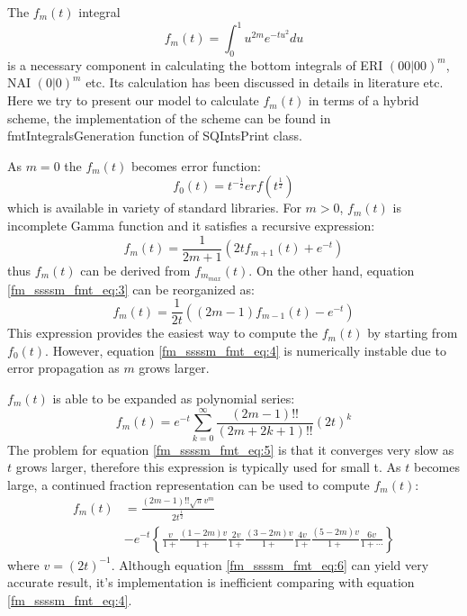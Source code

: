 The $f_{m}(t)$ integral
\begin{equation}\label{fm_ssssm_fmt_eq:1}
 f_{m}(t) = \int^{1}_{0} u^{2m} e^{-tu^{2}} du 
\end{equation}
is a necessary component in calculating the bottom integrals of ERI $(00|00)^{m}$,
NAI $(0|0)^{m}$ etc. Its calculation has been discussed in details in literature
\cite{harris1983sssm, gill1991two} etc. Here we try to present our model to calculate
$f_{m}(t)$ in terms of a hybrid scheme, the implementation of the scheme can be 
found in fmtIntegralsGeneration function of SQIntsPrint class.

As $m=0$ the $f_{m}(t)$ becomes error function:
\begin{equation}
 f_{0}(t) = t^{-\frac{1}{2}} erf(t^{\frac{1}{2}})
\label{fm_ssssm_fmt_eq:2}
\end{equation}
which is available in variety of standard libraries. For $m>0$, $f_{m}(t)$
is incomplete Gamma function and it satisfies a recursive expression:
\begin{equation}
  f_{m}(t) = \frac{1}{2m+1}\left( 2tf_{m+1}(t) + e^{-t}\right)  
 \label{fm_ssssm_fmt_eq:3}
\end{equation}
thus $f_{m}(t)$ can be derived from $f_{m_{max}}(t)$. On the other hand, equation
\ref{fm_ssssm_fmt_eq:3} can be reorganized as:
\begin{equation}
  f_{m}(t) = \frac{1}{2t}\left( (2m-1)f_{m-1}(t) - e^{-t}\right)    
 \label{fm_ssssm_fmt_eq:4}
\end{equation}
This expression provides the easiest way to compute the $f_{m}(t)$ by starting from 
$f_{0}(t)$. However, equation \ref{fm_ssssm_fmt_eq:4} is numerically instable due to
error propagation as $m$ grows larger.

$f_{m}(t)$ is able to be expanded as polynomial series:
\begin{equation}
 \label{fm_ssssm_fmt_eq:5}
 f_{m}(t) = e^{-t}\sum_{k=0}^{\infty}\frac{(2m-1)!!}{(2m+2k+1)!!}
 (2t)^{k}
\end{equation}
The problem for equation \ref{fm_ssssm_fmt_eq:5} is that it converges very slow as $t$
grows larger, therefore this expression is typically used for small t. As $t$ becomes large,
a continued fraction representation can be used to compute $f_{m}(t)$\cite{harris1983sssm}:
\begin{equation}
\begin{split}
f_{m}(t) &= \frac{(2m-1)!!\sqrt{\pi}v^{m}}{2t^{\frac{1}{2}}} \\
         &- e^{-t}
         \left\lbrace 
         \frac{v}{1+}\frac{(1-2m)v}{1+}\frac{2v}{1+}\frac{(3-2m)v}{1+}\frac{4v}{1+}
         \frac{(5-2m)v}{1+}\frac{6v}{1+\cdots}
         \right\rbrace 
\end{split}
\label{fm_ssssm_fmt_eq:6}
\end{equation}
where $v = (2t)^{-1}$. Although equation \ref{fm_ssssm_fmt_eq:6} can yield very accurate
result, it's implementation is inefficient comparing with equation \ref{fm_ssssm_fmt_eq:4}.

